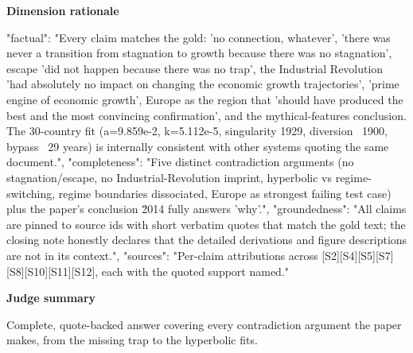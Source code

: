 \documentclass[10pt]{article}
\begin{document}
\textbf{Dimension rationale}
\begin{EvidenceText}
{
  "factual": "Every claim matches the gold: 'no connection, whatever', 'there was never a transition from stagnation to growth because there was no stagnation', escape 'did not happen because there was no trap', the Industrial Revolution 'had absolutely no impact on changing the economic growth trajectories', 'prime engine of economic growth', Europe as the region that 'should have produced the best and the most convincing confirmation', and the mythical-features conclusion. The 30-country fit (a=9.859e-2, k=5.112e-5, singularity 1929, diversion ~1900, bypass ~29 years) is internally consistent with other systems quoting the same document.",
  "completeness": "Five distinct contradiction arguments (no stagnation/escape, no Industrial-Revolution imprint, hyperbolic vs regime-switching, regime boundaries dissociated, Europe as strongest failing test case) plus the paper's conclusion \u2014 fully answers 'why'.",
  "groundedness": "All claims are pinned to source ids with short verbatim quotes that match the gold text; the closing note honestly declares that the detailed derivations and figure descriptions are not in its context.",
  "sources": "Per-claim attributions across [S2][S4][S5][S7][S8][S10][S11][S12], each with the quoted support named."
}
\end{EvidenceText}

\textbf{Judge summary}
\begin{EvidenceText}
Complete, quote-backed answer covering every contradiction argument the paper makes, from the missing trap to the hyperbolic fits.
\end{EvidenceText}
\end{document}
